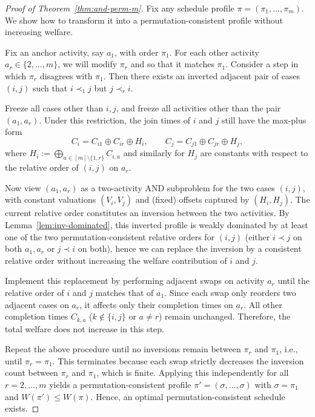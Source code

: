 \documentclass[letterpaper]{article}
\begin{document}
\begin{proof}[Proof of Theorem~\ref{thm:and-perm-m}]
Fix any schedule profile $\pi=(\pi_1,\ldots,\pi_m)$. We show how to transform it
into a permutation-consistent profile without increasing welfare.

Fix an anchor activity, say $a_1$, with order $\pi_1$. For each other activity
$a_r \in \{2,\ldots,m\}$, we will modify $\pi_r$ and  so that it  matches $\pi_1$.
Consider a step in which $\pi_r$ disagrees with $\pi_1$. Then there exists an
inverted adjacent pair of cases $(i,j)$ such that $i\prec_{1} j$ but $j\prec_{r} i$.

Freeze all cases other than $i,j$, and freeze all activities other than the pair
$(a_1,a_r)$. Under this restriction, the join times of $i$ and $j$ still have the
max-plus form
\[
C_i = C_{i1}\oplus C_{ir}\oplus H_i,\qquad
C_j = C_{j1}\oplus C_{jr}\oplus H_j,
\]
where $H_i:=\bigoplus_{a\in[m]\setminus\{1,r\}} C_{i,a}$ and similarly for $H_j$
are constants with respect to the relative order of $(i,j)$ on $a_r$.


Now view $(a_1,a_r)$ as a two-activity AND subproblem for the two cases $(i,j)$,
with constant valuations $(V_i,V_j)$ and (fixed) offsets captured by $(H_i,H_j)$.
The current relative order constitutes an inversion between the two activities.
By Lemma~\ref{lem:inv-dominated}, this inverted profile is weakly dominated by at
least one of the two permutation-consistent relative orders for $(i,j)$ (either
$i\prec j$ on both $a_1,a_r$ or $j\prec i$ on both), hence we can replace the
inversion by a consistent relative order without increasing the welfare
contribution of $i$ and $j$.

Implement this replacement by performing adjacent swaps on activity $a_r$ until
the relative order of $i$ and $j$ matches that of $a_1$. Since each swap only
reorders two adjacent cases on $a_r$, it affects only their completion times on
$a_r$. All other completion times $C_{k,a}$ ($k\notin\{i,j\}$ or $a\neq r$) remain
unchanged. Therefore, the total welfare does not increase in this step.

Repeat the above procedure until no inversions remain between $\pi_r$ and $\pi_1$,
i.e., until $\pi_r=\pi_1$. This terminates because each swap strictly decreases
the inversion count between $\pi_r$ and $\pi_1$, which is finite.
Applying this independently for all $r=2,\ldots,m$ yields a permutation-consistent
profile $\pi'=(\sigma,\ldots,\sigma)$ with $\sigma=\pi_1$ and $W(\pi')\le W(\pi)$.
Hence, an optimal permutation-consistent schedule exists.
\end{proof}
\end{document}
